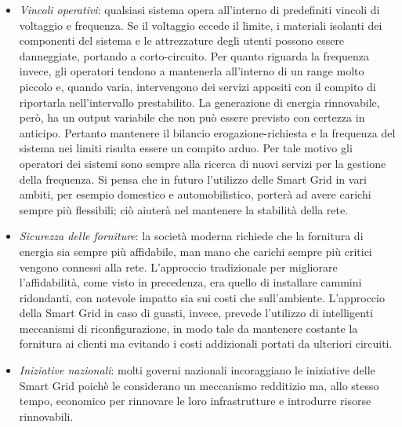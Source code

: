 \begin{itemize}
\item \textit{Vincoli operativi}: qualsiasi sistema opera all'interno di predefiniti vincoli di voltaggio e frequenza. Se il voltaggio eccede il limite, i materiali isolanti dei componenti del sistema e le attrezzature degli utenti possono essere danneggiate, portando a corto-circuito. \newline Per quanto riguarda la frequenza invece, gli operatori tendono a mantenerla all'interno di un range molto piccolo e, quando varia, intervengono dei servizi appositi con il compito di riportarla nell'intervallo prestabilito. \newline
La generazione di energia rinnovabile, però, ha un output variabile che non può essere previsto con certezza in anticipo. Pertanto mantenere il bilancio erogazione-richiesta e la frequenza del sistema nei limiti risulta essere un compito arduo. Per tale motivo gli operatori dei sistemi sono sempre alla ricerca di nuovi servizi per la gestione della frequenza. \newline Si pensa che in futuro l'utilizzo delle Smart Grid in vari ambiti, per esempio domestico e automobilistico, porterà ad avere carichi sempre più flessibili; ciò aiuterà nel mantenere la stabilità della rete.

\item \textit{Sicurezza delle forniture}: la società moderna richiede che la fornitura di energia sia sempre più affidabile, man mano che carichi sempre più critici vengono connessi alla rete. L'approccio tradizionale per migliorare l'affidabilità, come visto in precedenza, era quello di installare cammini ridondanti, con notevole impatto sia sui costi che sull'ambiente. \newline L'approccio della Smart Grid in caso di guasti, invece, prevede l'utilizzo di intelligenti meccanismi di riconfigurazione, in modo tale da mantenere costante la fornitura ai clienti ma evitando i costi addizionali portati da ulteriori circuiti.
\item \textit{Iniziative nazionali}: molti governi nazionali incoraggiano le iniziative delle Smart Grid poichè le considerano un meccanismo redditizio ma, allo stesso tempo, economico per rinnovare le loro infrastrutture e introdurre risorse rinnovabili.
\end{itemize}


